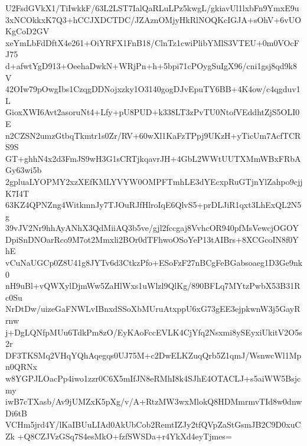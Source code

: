 U2FsdGVkX1/TiIwkkF/63L2LST7IalQaRLuLPz5kwgL/gkiavUl1lxbFn9YmxE9u
3xNCOkkxK7Q3+hCCJXDCTDC/JZAznOMjyHkRlNOQKcIGJA+sOhV+6vUOKgCoD2GV
xeYmLbFdDftX4e261+OiYRFX1FnB18/ClnTz1cwiPlibYMlS3VTEU+0m0VOcFJ75
d+afwtYgD913+OeehaDwkN+WRjPn+h+5bpi71cPOygSuIgX96/cni1gsj8qd9k8V
42OIw79pOwgIbs1CzqgDDNojxzky1O3140gogDJvEpuTY6BB+4K4ow/c4qgduv1L
GioxXWI6Avt2asoruNt4+Lfy+pU8PUD+k338LT3zPvTU0NtofVEddhtZjS5OLI0E
n2CZSN2umzGtbqTkmtr1s0Zr/RV+60wXl1KaFzTPpj9UKzH+yTicUm7AcfTCRS9S
GT+ghhN4x2d3FmJS9wH3G1sCRTjkqavrJH+4GbL2WWtUUTXMmWBxFRbAGy63wi5b
2gpluaLYOPMY2xzXEfKMLYVYW0OMPFTmhLE3dYEcxpRuGTjnYlZahpo9cjjK7I4T
63KZ4QPNZng4WitkmnJy7TJOuRJfHlroIqE6QlvS5+prDLJiR1qxt3LhExQL2N5g
39vJV2Nr9hhAyANhX3QdMiiAQ3b5ve/gjl2fccgaj8VvhcOR940pfMsVewcjOGOY
DpiSnDNOarRco9M7ot2Mmxli2BOr0dTFhwoOSoYeP13tAIBrs+8XCGcoIN8f0YhE
vCuNaUGCp0Z8U41g8JYTv6d3CtkzPfo+ESoFzF27nBCgFeBGabsoaeg1D3Ge9nk0
nH9uBl+vQWXylDjmWw5ZaHlWxs1uWlzl9QlKg/890BFLq7MYtzPwbX53B31Rc0Su
NrDtDw/uizeGaFNWLvIBnxdSSoXbMUruAtxppU6xG73gEE3ejpkwnW3j5GayRrnw
j+DgLQNfpMUu6TdkPm8zO/EyKAoFccEVLK4CjYfq2Nsxmi8ySEyxiUkitV2O5s2r
DF3TKSMq2VHqYQhAqegqs0UJ75M+c2DwELKZuqQrb5Z1qmJ/WsnwcWl1Mpn0QRNx
w8YGPJLOacPp4iwo1zzr0C6X5mIfJN8eRMhI8k4SJhE4OTACLJ+s5aiWW5Bsjcmy
iwB7cTXasb/Av9jUMZxK5pXg/v/A+RtzMW3wxMlokQ8HDMmrmvTId8w0dnwDi6tB
VCHm5jrd4Y/lKaIBUuLIAd0AkUbCob2RemtIZJy2tfQVpZaStGsmJB2C9D0xuCZk
+Q8CZJVzGSq7S4esMkO+fzfSWSDa+r4YkXd4eyTjmes=

